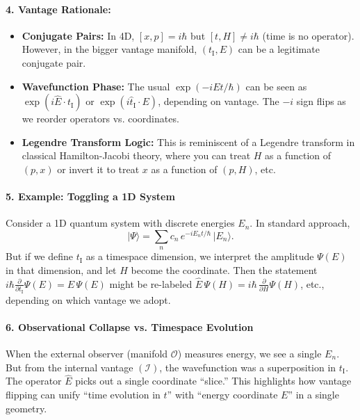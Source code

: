 \documentclass{article}
\begin{document}
\paragraph{4. Vantage Rationale:}\vspace{-6pt}
\begin{itemize}
\item \textbf{Conjugate Pairs:} In 4D, $[x,p]=i\hbar$ but $[t,H]\neq i\hbar$ (time is no operator). However, in the bigger vantage manifold, $(t_{\mathrm{I}}, E)$ can be a legitimate conjugate pair.\vspace{-4pt}
\item \textbf{Wavefunction Phase:} The usual $\exp(-iEt/\hbar)$ can be seen as $\exp(i\hat{E}\cdot t_{\mathrm{I}})$ or $\exp(i\hat{t}_{\mathrm{I}}\cdot E)$, depending on vantage. The $-i$ sign flips as we reorder operators vs. coordinates.\vspace{-4pt}
\item \textbf{Legendre Transform Logic:} This is reminiscent of a Legendre transform in classical Hamilton-Jacobi theory, where you can treat $H$ as a function of $(p,x)$ or invert it to treat $x$ as a function of $(p,H)$, etc.
\end{itemize}

\paragraph{5. Example: Toggling a 1D System}
Consider a 1D quantum system with discrete energies $E_n$. In standard approach,
\begin{equation}
\lvert\Psi\rangle = \sum_{n} c_n \, e^{-iE_n t/\hbar}\,\lvert E_n\rangle.
\end{equation}
But if we define $t_{\mathrm{I}}$ as a timespace dimension, we interpret the amplitude $\Psi(E)$ in that dimension, and let $H$ become the coordinate. Then the statement $i\hbar \tfrac{\partial}{\partial t_{\mathrm{I}}}\Psi(E) = E\,\Psi(E)$ might be re-labeled $\hat{E}\,\Psi(H)= i\hbar\,\tfrac{\partial}{\partial H}\Psi(H)$, etc., depending on which vantage we adopt.

\paragraph{6. Observational Collapse vs. Timespace Evolution}
When the external observer (manifold $\mathcal{O}$) measures energy, we see a single $E_n$. But from the internal vantage $(\mathcal{I})$, the wavefunction was a superposition in $t_{\mathrm{I}}$. The operator $\hat{E}$ picks out a single coordinate “slice.” This highlights how vantage flipping can unify “time evolution in $t$” with “energy coordinate $E$” in a single geometry.
\end{document}
